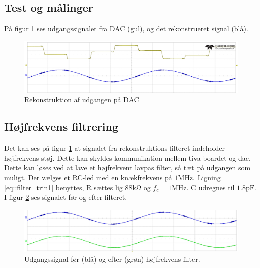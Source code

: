 \subsection{Test og målinger}
På figur \ref{fig::anfilter_recon} ses udgangssignalet fra DAC (gul), og det rekonstrueret signal (blå).
\begin{figure}[h!]
	\centering
	\includegraphics[scale = 0.4]{./billeder/reconstruction}
	\caption{Rekonstruktion af udgangen på DAC}
	\label{fig::anfilter_recon}
\end{figure}
\FloatBlock

\subsection{Højfrekvens filtrering}
Det kan ses på figur \ref{fig::anfilter_recon} at signalet fra rekonstruktions filteret indeholder højfrekvens støj. Dette kan skyldes kommunikation mellem tiva boardet og dac. \\
Dette kan løses ved at lave et højfrekvent lavpas filter, så tæt på udgangen som muligt. Der vælges et RC-led med en knækfrekvens på $1\si{\mega\hertz}$. Ligning \ref{eq::filter_trin1} benyttes, R sættes lig $88\si{\kilo\ohm}$ og $f_c = 1\si{\mega\hertz}$. C udregnes til $1.8\si{\pico\farad}$. I figur \ref{fig::anfilter_hf} ses signalet før og efter filteret.


\begin{figure}[h!]
	\centering
	\includegraphics[scale = 0.4]{./billeder/hf.png}
	\caption{Udgangssignal før (blå) og efter (grøn) højfrekvens filter.}
	\label{fig::anfilter_hf}
\end{figure}
